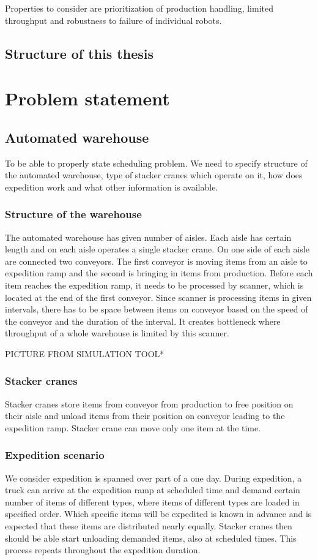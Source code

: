 \documentclass{ctuthesis}
\begin{document}
Properties to consider are prioritization of production handling, limited throughput and robustness to failure of individual robots. 

\section{Structure of this thesis}



\chapter{Problem statement}
\section{Automated warehouse}
To be able to properly state scheduling problem. We need to specify structure of the automated warehouse, type of stacker cranes which operate on it, how does expedition work and what other information is available.

\subsection{Structure of the warehouse}

The automated warehouse has given number of aisles. Each aisle has certain length and on each aisle operates a single stacker crane. On one side of each aisle are connected two conveyors. The first conveyor is moving items from an aisle to expedition ramp and the second is bringing in items from production. Before each item reaches the expedition ramp, it needs to be processed by scanner, which is located at the end of the first conveyor. Since scanner is processing items in given intervals, there has to be space between items on conveyor based on the speed of the conveyor and the duration of the interval. It creates bottleneck where throughput of a whole warehouse is limited by this scanner.


PICTURE FROM SIMULATION TOOL*
\subsection{Stacker cranes}
Stacker cranes store items from conveyor from production to free position on their aisle and unload items from their position on conveyor leading to the expedition ramp. Stacker crane can move only one item at the time. 

\subsection{Expedition scenario}
We consider expedition is spanned over part of a one day. During expedition, a truck can arrive at the expedition ramp at scheduled time and demand certain number of items of different types, where items of different types are loaded in specified order. Which specific items will be expedited is known in advance and is expected that these items are distributed nearly equally. Stacker cranes then should be able start unloading demanded items, also at scheduled times. This process repeats throughout the expedition duration. 
\end{document}
